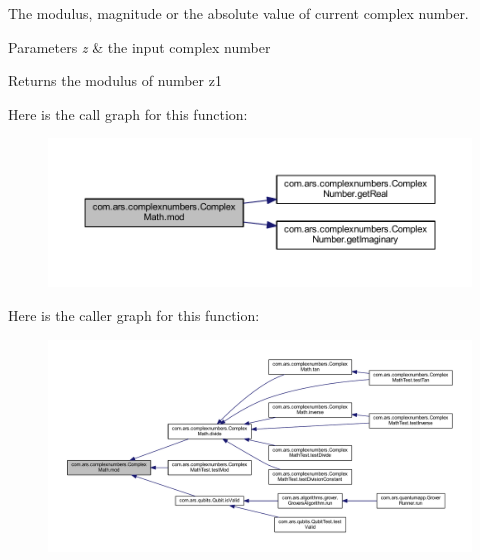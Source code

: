 The modulus, magnitude or the absolute value of current complex number. 
\begin{DoxyParams}{Parameters}
{\em z} & the input complex number \\
\hline
\end{DoxyParams}
\begin{DoxyReturn}{Returns}
the modulus of number z1 
\end{DoxyReturn}
Here is the call graph for this function\+:
\nopagebreak
\begin{figure}[H]
\begin{center}
\leavevmode
\includegraphics[width=350pt]{classcom_1_1ars_1_1complexnumbers_1_1_complex_math_a1ffa4f4678b201779a1ac8212fc93e05_cgraph}
\end{center}
\end{figure}
Here is the caller graph for this function\+:
\nopagebreak
\begin{figure}[H]
\begin{center}
\leavevmode
\includegraphics[width=350pt]{classcom_1_1ars_1_1complexnumbers_1_1_complex_math_a1ffa4f4678b201779a1ac8212fc93e05_icgraph}
\end{center}
\end{figure}
\hypertarget{classcom_1_1ars_1_1complexnumbers_1_1_complex_math_a0283601c9ce6efc0636468ee5e65f299}{}\label{classcom_1_1ars_1_1complexnumbers_1_1_complex_math_a0283601c9ce6efc0636468ee5e65f299} 
